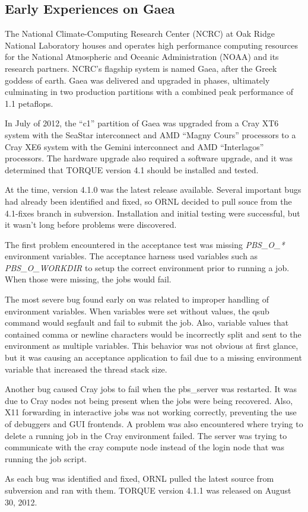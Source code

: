 \subsection{Early Experiences on Gaea}

The National Climate-Computing Research Center (NCRC) at Oak Ridge National
Laboratory houses and operates high performance computing resources for the
National Atmospheric and Oceanic Administration (NOAA) and its research
partners.  NCRC's flagship system is named Gaea, after the Greek goddess of
earth.  Gaea was delivered and upgraded in phases, ultimately culminating in
two production partitions with a combined peak performance of 1.1 petaflops.

In July of 2012, the ``c1'' partition of Gaea was upgraded from a Cray XT6
system with the SeaStar interconnect and AMD ``Magny Cours'' processors to a
Cray XE6 system with the Gemini interconnect and AMD ``Interlagos'' processors.
The hardware upgrade also required a software upgrade, and it was determined
that TORQUE version 4.1 should be installed and tested.

At the time, version 4.1.0 was the latest release available.  Several important
bugs had already been identified and fixed, so ORNL decided to pull souce from
the 4.1-fixes branch in subversion.  Installation and initial testing were
successful, but it wasn't long before problems were discovered.

The first problem encountered in the acceptance test was missing \emph{PBS_O_*}
environment variables.  The acceptance harness used variables such as
\emph{PBS_O_WORKDIR} to setup the correct environment prior to running a job.
When those were missing, the jobs would fail.

The most severe bug found early on was related to improper handling of
environment variables.  When variables were set without values, the qsub
command would segfault and fail to submit the job.  Also, variable values that
contained comma or newline characters would be incorrectly split and sent to
the environment as multiple variables.  This behavior was not obvious at first
glance, but it was causing an acceptance application to fail due to a missing
environment variable that increased the thread stack size.

Another bug caused Cray jobs to fail when the pbs_server was restarted.  It was
due to Cray nodes not being present when the jobs were being recovered.  Also,
X11 forwarding in interactive jobs was not working correctly, preventing the
use of debuggers and GUI frontends.  A problem was also encountered where
trying to delete a running job in the Cray environment failed.  The server was
trying to communicate with the cray compute node instead of the login node that
was running the job script.

As each bug was identified and fixed, ORNL pulled the latest source from
subversion and ran with them.  TORQUE version 4.1.1 was released on August 30,
2012.

